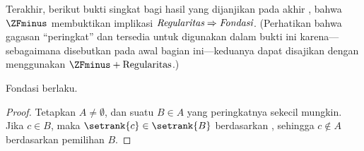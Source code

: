 \documentclass[../../../include/open-logic-section]{subfiles}
\begin{document}
Terakhir, berikut bukti singkat bagi hasil yang dijanjikan pada akhir
, bahwa $\ZFminus$ membuktikan implikasi
$\emph{Regularitas} \Rightarrow \emph{Fondasi}$. (Perhatikan bahwa gagasan
``peringkat'' dan  tersedia untuk digunakan dalam
bukti ini karena---sebagaimana disebutkan pada awal bagian ini---keduanya
dapat disajikan dengan menggunakan $\ZFminus + \text{Regularitas}$.)

\begin{prop} Fondasi berlaku.
\end{prop}

\begin{proof}
Tetapkan $A \neq \emptyset$, dan suatu $B \in A$ yang peringkatnya sekecil
mungkin. Jika $c \in B$, maka $\setrank{c} \in \setrank{B}$ berdasarkan
, sehingga $c \notin A$ berdasarkan pemilihan $B$.
\end{proof}
\end{document}
